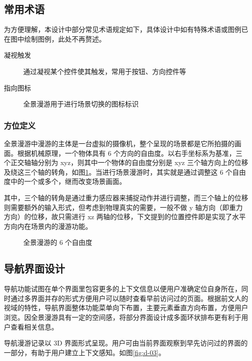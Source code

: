 \subsection{常用术语}
为方便理解，本设计中部分常见术语规定如下，具体设计中如有特殊术语或图例已在图中绘制图例，此处不再赘述。

\begin{description}
  \item [凝视触发] 通过凝视某个控件使其触发，常用于按钮、方向控件等
  \item [指向图标] 全景漫游用于进行场景切换的图标标识
\end{description}

\subsubsection{方位定义}
全景漫游中漫游的主体是一台虚拟的摄像机，整个呈现的场景都是它所拍摄的画面。根据机械原理，一个物体具有 6 个方向的自由度。以右手坐标系为基准，三个正交轴轴分别为 xyz，则其中一个物体的自由度分别是 xyz 三个轴方向上的位移及绕这三个轴的转角，如图\ref{fig:d-13}。当进行场景漫游时，其实就是通过调整这 6 个自由度中的一个或多个，继而改变场景画面。

其中，三个轴的转角是通过重力感应器来捕捉动作并进行调整，而三个轴上的位移则需要额外的输入形式，但考虑到物理真实的需要，一般不做 y 轴方向（即重力方向）的位移，故只需进行 xz 两轴的位移，下文提到的位置控件即是实现了水平方向内在场景内的漫游功能。

\begin{figure}[htp]
\centering
{}
\caption{全景漫游的 6 个自由度}
\label{fig:d-13}
\end{figure}

\subsection{导航界面设计}
导航功能试图在单个界面里包容更多的上下文信息以便用户准确定位自身所在，同时通过多界面并存的形式方便用户可以随时查看早前访问过的页面。根据前文人的视域的特性，导航界面整体功能菜单向下布置，主要元素垂直方向布置，方便用户浏览。因全景漫游具有一定的空间感，将部分界面设计成多面环状排布更有利于用户查看相关信息。

导航漫游记录以 3D 界面形式呈现。用户可由当前界面观察到早先访问过的界面的一部分，有助于用户建立上下文感知。如图\ref{fig:d-03}。

